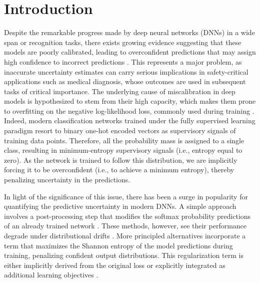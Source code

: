 \documentclass[twocolumn,final,10pt]{elsarticle}
\newcommand{\rev}[1]{{\color{black}#1}}
\begin{document}
\setlength{\parskip}{3pt}


\section{Introduction}
\label{sec:intro}
Despite the remarkable progress made by deep neural networks (DNNs) in a wide span or recognition tasks, there exists growing evidence suggesting that these models are poorly calibrated, leading to overconfident predictions that may assign high confidence to incorrect predictions \citep{gal2016dropout,guo2017calibration}. %
This represents a major problem, as inaccurate uncertainty estimates can carry serious implications in safety-critical applications such as medical diagnosis, whose outcomes are used in subsequent tasks of critical importance. %
The underlying cause of miscalibration in deep models is hypothesized to stem from their high capacity, which makes them prone to overfitting on the negative log-likelihood loss, commonly used during training \citep{guo2017calibration}. \rev{Indeed, modern classification networks trained under the fully supervised learning paradigm resort to binary one-hot encoded vectors as supervisory signals of training data points. Therefore, all the probability mass is assigned to a single class, resulting in minimum-entropy supervisory signals (i.e., entropy equal to zero). As the network is trained to follow this distribution, we are implicitly forcing it to be overconfident (i.e., to achieve a minimum entropy), thereby penalizing uncertainty in the predictions. }


In light of the significance of this issue, there has been a surge in popularity for quantifying the predictive uncertainty in modern DNNs. A simple approach involves a post-processing step that modifies the softmax probability predictions of an already trained network \citep{guo2017calibration,tomani2021post,zhang2020mix,ding2021local}. \rev{These methods, however, see their performance degrade under distributional drifts \citep{ovadia2019can}. More principled alternatives incorporate a term that maximizes the Shannon entropy of the model predictions during training, penalizing confident output distributions. This regularization term is either implicitly derived from the original loss \citep{mukhoti2020calibrating,muller2019does} or explicitly integrated as additional learning objectives \citep{pereyra2017regularizing,liu2022devil,liu2023class}. }
\end{document}
